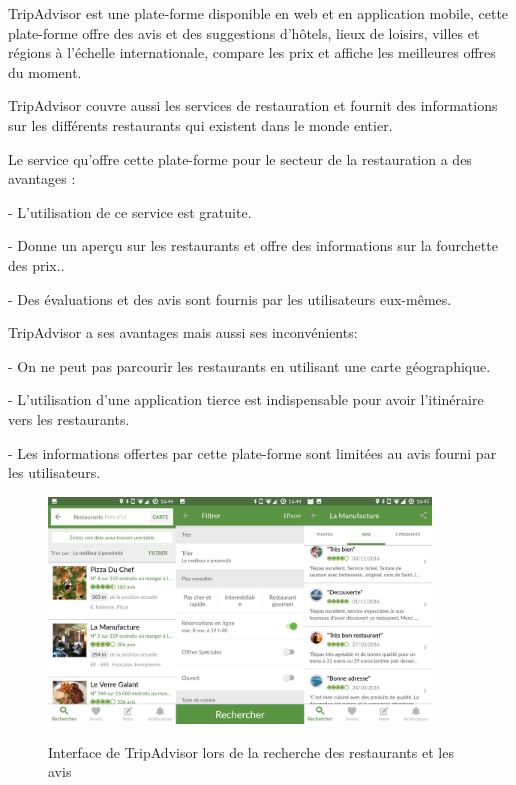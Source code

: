 TripAdvisor est une plate-forme disponible en web et en application mobile, cette plate-forme offre des avis et des suggestions d'hôtels, lieux de loisirs, villes et régions à l'échelle internationale, compare les prix et affiche les meilleures offres du moment.

TripAdvisor couvre aussi les services de restauration et fournit des informations sur les différents restaurants qui existent dans le monde entier. \bigskip

Le service qu'offre cette plate-forme pour le secteur de la restauration a des avantages : \bigskip

	\tab- L'utilisation de ce service est gratuite.\medskip

	\tab- Donne un aperçu sur les restaurants et offre des informations sur la fourchette des prix..\medskip

	\tab- Des évaluations et des avis sont fournis par les utilisateurs eux-mêmes.\bigskip

TripAdvisor a ses avantages mais aussi ses inconvénients:\bigskip

	\tab- On ne peut pas parcourir les restaurants en utilisant une carte géographique.\medskip

	\tab- L'utilisation d'une application tierce est indispensable pour avoir l'itinéraire vers les restaurants.\medskip

	\tab- Les informations offertes par cette plate-forme sont limitées au avis fourni par les utilisateurs.
 

	\begin{figure}[!ht]

		\centering
		\includegraphics[width=4in]{images/Chapitre1/trip_advisor.jpeg}
		\label{fig:tripadvisor}
		\caption{Interface de TripAdvisor lors de la recherche des restaurants et les avis}
	 \end{figure}
\newpage
